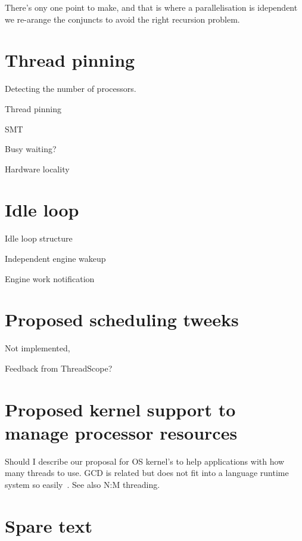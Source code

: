 
There's ony one point to make, and that is where a parallelisation is
idependent we re-arange the conjuncts to avoid the right recursion problem.

\section{Thread pinning}
\label{sec:thread_pinning}

Detecting the number of processors.

Thread pinning

SMT

Busy waiting?

Hardware locality

\section{Idle loop}
\label{sec:idle_loop}

Idle loop structure

Independent engine wakeup

Engine work notification

\section{Proposed scheduling tweeks}
\label{sec:proposed_tweeks}

Not implemented,

Feedback from ThreadScope?

\section{Proposed kernel support to manage processor resources}
\label{sec:kernel_scheduling_help}

    
Should I describe our proposal for OS kernel's to help
applications with how many threads to use.
GCD is related but does not fit into a language runtime system so
easily~\cite{apple_gcd}.
See also N:M threading.

\section{Spare text}

